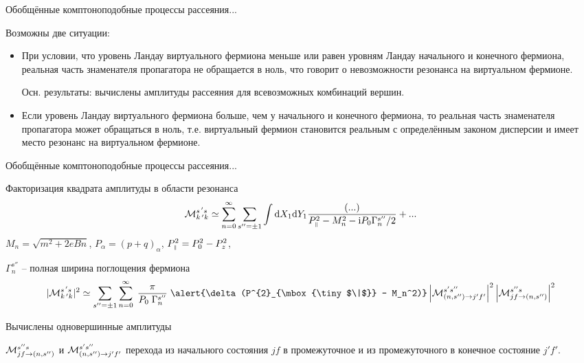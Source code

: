 \documentclass{beamer}
\def\mprl{\mbox{\tiny $\|$}}
\newcommand{\ii}{\mathrm{i}}
\newcommand{\dd}{\mathrm{d}}
\begin{document}
\begin{frame}{Обобщённые комптоноподобные процессы рассеяния...}
\begin{center}

Возможны две ситуации:
\begin{itemize}
\item
При условии, что уровень Ландау виртуального фермиона меньше или равен
уровням Ландау начального и конечного фермиона, реальная часть знаменателя пропагатора
не обращается в ноль, что говорит о невозможности резонанса на виртуальном фермионе.
\vspace*{3mm}

\alert{Осн. результаты:} вычислены амплитуды рассеяния для всевозможных комбинаций вершин.

\vspace*{3mm}

\item Если уровень Ландау виртуального фермиона больше, чем 
у начального и конечного фермиона, то реальная часть знаменателя пропагатора может обращаться в ноль, 
т.е. виртуальный фермион становится реальным с определённым законом дисперсии и 
имеет место резонанс на виртуальном фермионе.

\end{itemize}
\end{center}
\end{frame}
\begin{frame}{Обобщённые комптоноподобные процессы рассеяния...}
\begin{center}
Факторизация квадрата амплитуды в области резонанса
$${\cal M}^{s^{\, \prime} s}_{k^{\, \prime} k}\simeq \sum\limits_{n=0}^{\infty}
\sum\limits_{s''=\pm 1} \int \dd X_1 \dd Y_1 
\frac{(...)}{P^2_{\mprl}-M_n^2-\ii P_0\Gamma_n^{s''}/2}+...$$
%
$M_n = \sqrt{m^2+2eBn}$, $P_{\alpha} = (p+q)_{\alpha}$, 
$P^2_{\mprl} = P_0^2-P_z^2$, 

$\Gamma_n^{s''}$ -- полная ширина поглощения фермиона
%
$$|{\cal M}^{s^{\, \prime} s}_{k^{\, \prime} k}|^2 \simeq  \sum\limits_{s''=\pm 1} \sum\limits_{n=0}^{\infty} \;  
\frac{\pi}{P_0 \; \Gamma_n^{s''}} \; \alert{\delta (P^{2}_{\mprl} - M_n^2)}
\left |{\cal M}^{s' s''}_{(n,s'') \to j'f'}\right |^2 \left |{\cal M}^{s'' s}_{jf \to (n, s'')}\right |^2$$ 

\alert{Вычислены} одновершинные амплитуды 

${\cal M}^{s'' s}_{jf \to (n, s'')}$ и ${\cal M}^{s' s''}_{(n,s'') \to j'f'}$ перехода
из начального состояния $jf$ в промежуточное и из промежуточного в конечное состояние $j'f'$.
\end{center}
\end{frame}
\end{document}
